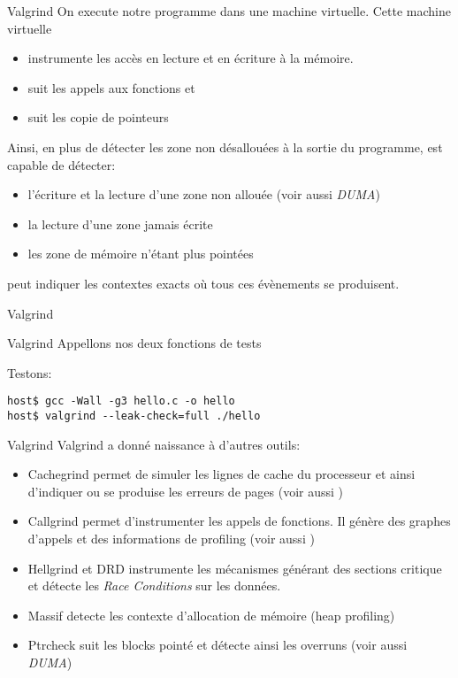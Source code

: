 \begin{frame}[fragile=singleslide]{Valgrind}
  On execute notre programme dans une machine virtuelle. Cette machine
  virtuelle
  \begin{itemize} 
  \item instrumente les accès en lecture et en écriture à la mémoire. 
  \item suit les appels aux fonctions  et 
  \item suit les copie de pointeurs
  \end{itemize}
  Ainsi, en plus  de détecter les zone non désallouées  à la sortie du
  programme,  est capable de détecter:
  \begin{itemize} 
  \item l'écriture  et la lecture  d'une zone non allouée  (voir aussi
    \emph{DUMA})
  \item la lecture d'une zone jamais écrite
  \item les zone de mémoire n'étant plus pointées
  \end{itemize}
    peut  indiquer  les  contextes exacts  où  tous  ces
  évènements se produisent.
\end{frame}

\begin{frame}[fragile=singleslide]{Valgrind}
  
\end{frame}

\begin{frame}[fragile=singleslide]{Valgrind}
  Appellons nos deux fonctions de tests
  
  Testons:
  \begin{lstlisting}
host$ gcc -Wall -g3 hello.c -o hello
host$ valgrind --leak-check=full ./hello
  \end{lstlisting}
\end{frame}

\begin{frame}[fragile=singleslide]{Valgrind}
  Valgrind a donné naissance à d'autres outils:
  \begin{itemize}
  \item Cachegrind permet de simuler les lignes de cache du processeur
    et  ainsi d'indiquer  ou se  produise les  erreurs de  pages (voir
    aussi )
  \item Callgrind  permet d'instrumenter  les appels de  fonctions. Il
    génère des graphes d'appels et des informations de profiling (voir
    aussi )
  \item  Hellgrind  et DRD  instrumente  les  mécanismes générant  des
    sections critique  et détecte  les \emph{Race Conditions}  sur les
    données.
  \item  Massif detecte  les  contexte d'allocation  de mémoire  (heap
    profiling)
  \item Ptrcheck suit les blocks  pointé et détecte ainsi les overruns
    (voir aussi \emph{DUMA})
  \end{itemize} 
\end{frame}

